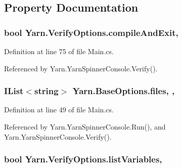 \subsection{Property Documentation}
\hypertarget{a00169_af9b6917244075618720f2a90bbe6ef56}{
\subsubsection[{compile\-And\-Exit}]{\setlength{\rightskip}{0pt plus 5cm}bool Yarn.\-Verify\-Options.\-compile\-And\-Exit\hspace{0.3cm}{\ttfamily [get]}, {\ttfamily [set]}}}\label{a00169_af9b6917244075618720f2a90bbe6ef56}


Definition at line 75 of file Main.\-cs.



Referenced by Yarn.\-Yarn\-Spinner\-Console.\-Verify().

\hypertarget{a00040_aa93cbb1bc1d5328e0a417012621e92d2}{
\subsubsection[{files}]{\setlength{\rightskip}{0pt plus 5cm}I\-List$<$string$>$ Yarn.\-Base\-Options.\-files\hspace{0.3cm}{\ttfamily [get]}, {\ttfamily [set]}, {\ttfamily [inherited]}}}\label{a00040_aa93cbb1bc1d5328e0a417012621e92d2}


Definition at line 49 of file Main.\-cs.



Referenced by Yarn.\-Yarn\-Spinner\-Console.\-Run(), and Yarn.\-Yarn\-Spinner\-Console.\-Verify().

\hypertarget{a00169_a062775744f2d7144527fa3bca4b9b3ce}{
\subsubsection[{list\-Variables}]{\setlength{\rightskip}{0pt plus 5cm}bool Yarn.\-Verify\-Options.\-list\-Variables\hspace{0.3cm}{\ttfamily [get]}, {\ttfamily [set]}}}\label{a00169_a062775744f2d7144527fa3bca4b9b3ce}


